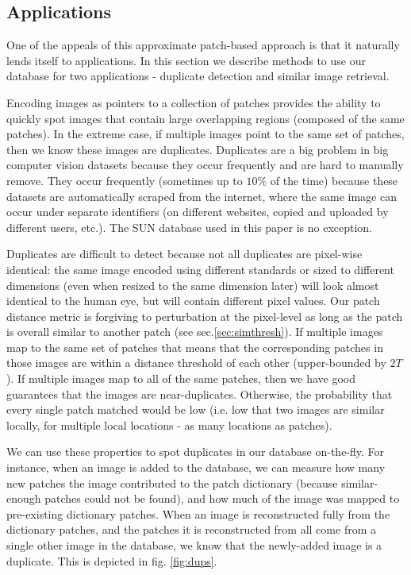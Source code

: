 \subsection{Applications}\label{sec:apps}

One of the appeals of this approximate patch-based approach
is that it naturally lends itself to applications. In this
section we describe methods to use our database for
two applications - duplicate detection and similar image retrieval.


Encoding images as pointers to a collection of patches provides the ability to quickly spot images that contain large overlapping regions (composed of the same patches). In the extreme case, if multiple images point to the same set of patches, then we know these images are duplicates. Duplicates are a big problem in big computer vision datasets because they occur frequently and are hard to manually remove. They occur frequently (sometimes up to $10\%$ of the time) because these datasets are automatically scraped from the internet, where the same image can occur under separate identifiers (on different websites, copied and uploaded by different users, etc.). The SUN database \cite{SUN} used in this paper is no exception.

Duplicates are difficult to detect because not all duplicates are pixel-wise identical: the same image encoded using different standards or sized to different dimensions (even when resized to the same dimension later) will look almost identical to the human eye, but will contain different pixel values. Our patch distance metric is forgiving to perturbation at the pixel-level as long as the patch is overall similar to another patch (see sec.\ref{sec:simthresh}). If multiple images map to the same set of patches that means that the corresponding patches in those images are within a distance threshold of each other (upper-bounded by $2T$). If multiple images map to all of the same patches, then we have good guarantees that the images are near-duplicates. Otherwise, the probability that every single patch matched would be low (i.e. low that two images are similar locally, for multiple local locations - as many locations as patches).

We can use these properties to spot duplicates in our database on-the-fly. For instance, when an image is added to the database, we can measure how many new patches the image contributed to the patch dictionary (because similar-enough patches could not be found), and how much of the image was mapped to pre-existing dictionary patches. When an image is reconstructed fully from the dictionary patches, and the patches it is reconstructed from all come from a single other image in the database, we know that the newly-added image is a duplicate. This is depicted in fig. \ref{fig:dups}.

